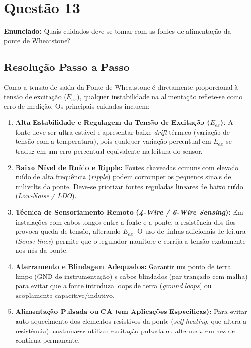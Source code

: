 


\section*{Questão 13}
\textbf{Enunciado:} Quais cuidados deve-se tomar com as fontes de alimentação da ponte de Wheatstone?

\subsection*{Resolução Passo a Passo}
Como a tensão de saída da Ponte de Wheatstone é diretamente proporcional à tensão de excitação ($E_{ex}$), qualquer instabilidade na alimentação reflete-se como erro de medição. Os principais cuidados incluem:

\begin{enumerate}
    \item \textbf{Alta Estabilidade e Regulagem da Tensão de Excitação ($E_{ex}$):}
    A fonte deve ser ultra-estável e apresentar baixo \textit{drift} térmico (variação de tensão com a temperatura), pois qualquer variação percentual em $E_{ex}$ se traduz em um erro percentual equivalente na leitura do sensor.

    \item \textbf{Baixo Nível de Ruído e Ripple:}
    Fontes chaveadas comuns com elevado ruído de alta frequência (\textit{ripple}) podem corromper os pequenos sinais de milivolts da ponte. Deve-se priorizar fontes reguladas lineares de baixo ruído (\textit{Low-Noise / LDO}).

    \item \textbf{Técnica de Sensoriamento Remoto (\textit{4-Wire / 6-Wire Sensing}):}
    Em instalações com cabos longos entre a fonte e a ponte, a resistência dos fios provoca queda de tensão, alterando $E_{ex}$. O uso de linhas adicionais de leitura (\textit{Sense lines}) permite que o regulador monitore e corrija a tensão exatamente nos nós da ponte.

    \item \textbf{Aterramento e Blindagem Adequados:}
    Garantir um ponto de terra limpo (GND de instrumentação) e cabos blindados (par trançado com malha) para evitar que a fonte introduza loops de terra (\textit{ground loops}) ou acoplamento capacitivo/indutivo.

    \item \textbf{Alimentação Pulsada ou CA (em Aplicações Específicas):}
    Para evitar auto-aquecimento dos elementos resistivos da ponte (\textit{self-heating}, que altera a resistência), costuma-se utilizar excitação pulsada ou alternada em vez de contínua permanente.
\end{enumerate}

